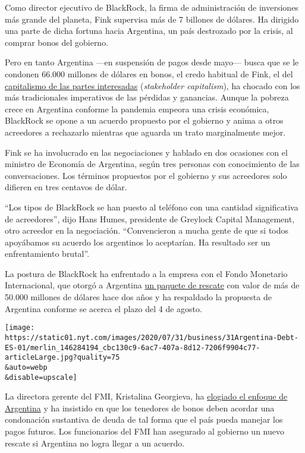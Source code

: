 Como director ejecutivo de BlackRock, la firma de administración de
inversiones más grande del planeta, Fink supervisa más de 7 billones de
dólares. Ha dirigido una parte de dicha fortuna hacia Argentina, un país
destrozado por la crisis, al comprar bonos del gobierno.

Pero en tanto Argentina ---en suspensión de pagos desde mayo--- busca
que se le condonen 66.000 millones de dólares en bonos, el credo
habitual de Fink, el del
\href{https://www.alainet.org/es/articulo/204355}{capitalismo de las
partes interesadas} (\emph{stakeholder capitalism}), ha chocado con los
más tradicionales imperativos de las pérdidas y ganancias. Aunque la
pobreza crece en Argentina conforme la pandemia empeora una crisis
económica, BlackRock se opone a un acuerdo propuesto por el gobierno y
anima a otros acreedores a rechazarlo mientras que aguarda un trato
marginalmente mejor.

Fink se ha involucrado en las negociaciones y hablado en dos ocasiones
con el ministro de Economía de Argentina, según tres personas con
conocimiento de las conversaciones. Los términos propuestos por el
gobierno y sus acreedores solo difieren en tres centavos de dólar.

``Los tipos de BlackRock se han puesto al teléfono con una cantidad
significativa de acreedores'', dijo Hans Humes, presidente de Greylock
Capital Management, otro acreedor en la negociación. ``Convencieron a
mucha gente de que si todos apoyábamos su acuerdo los argentinos lo
aceptarían. Ha resultado ser un enfrentamiento brutal''.

La postura de BlackRock ha enfrentado a la empresa con el Fondo
Monetario Internacional, que otorgó a Argentina
\href{https://www.nytimes.com/2018/06/07/business/argentina-imf-debt.html}{un
paquete de rescate} con valor de más de 50.000 millones de dólares hace
dos años y ha respaldado la propuesta de Argentina conforme se acerca el
plazo del 4 de agosto.

\texttt{[image: https://static01.nyt.com/images/2020/07/31/business/31Argentina-Debt-ES-01/merlin\_146284194\_cbc130c9-6ac7-407a-8d12-7206f9904c77-articleLarge.jpg?quality=75\\\&auto=webp\\\&disable=upscale]}

La directora gerente del FMI, Kristalina Georgieva, ha
\href{https://www.imf.org/es/News/Articles/2020/02/04/pr2034-statement-by-imf-managing-director-kristalina-georgieva-on-argentina}{elogiado
el enfoque de Argentina} y ha insistido en que los tenedores de bonos
deben acordar una condonación sustantiva de deuda de tal forma que el
país pueda manejar los pagos futuros. Los funcionarios del FMI han
asegurado al gobierno un nuevo rescate si Argentina no logra llegar a un
acuerdo.

